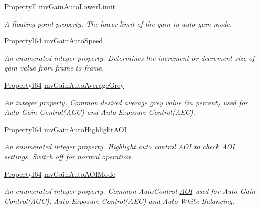 \begin{DoxyCompactItemize}
\hyperlink{group___common_interface_gaf54865fe5a3d5cfd15f9a111b40d09f9}{Property\+F} \hyperlink{classmv_i_m_p_a_c_t_1_1acquire_1_1_gen_i_cam_1_1_analog_control_aee3664e17216fc642f704fc52a4cbbbe}{mv\+Gain\+Auto\+Lower\+Limit}
\begin{DoxyCompactList}\small\item\em A floating point property. The lower limit of the gain in auto gain mode. \end{DoxyCompactList}\item 
\hyperlink{group___common_interface_ga81749b2696755513663492664a18a893}{Property\+I64} \hyperlink{classmv_i_m_p_a_c_t_1_1acquire_1_1_gen_i_cam_1_1_analog_control_a019e7f6318bde08ea5566e57a432dd16}{mv\+Gain\+Auto\+Speed}
\begin{DoxyCompactList}\small\item\em An enumerated integer property. Determines the increment or decrement size of gain value from frame to frame. \end{DoxyCompactList}\item 
\hyperlink{group___common_interface_ga81749b2696755513663492664a18a893}{Property\+I64} \hyperlink{classmv_i_m_p_a_c_t_1_1acquire_1_1_gen_i_cam_1_1_analog_control_adf7a7e9ec02c79afa826b8003e473adf}{mv\+Gain\+Auto\+Average\+Grey}
\begin{DoxyCompactList}\small\item\em An integer property. Common desired average grey value (in percent) used for Auto Gain Control(\+A\+G\+C) and Auto Exposure Control(\+A\+E\+C). \end{DoxyCompactList}\item 
\hyperlink{group___common_interface_ga81749b2696755513663492664a18a893}{Property\+I64} \hyperlink{classmv_i_m_p_a_c_t_1_1acquire_1_1_gen_i_cam_1_1_analog_control_aecf0b956ac5e1f86ae1caef0082fc5e1}{mv\+Gain\+Auto\+Highlight\+A\+O\+I}
\begin{DoxyCompactList}\small\item\em An enumerated integer property. Highlight auto control \hyperlink{struct_a_o_i}{A\+O\+I} to check \hyperlink{struct_a_o_i}{A\+O\+I} settings. Switch off for normal operation. \end{DoxyCompactList}\item 
\hyperlink{group___common_interface_ga81749b2696755513663492664a18a893}{Property\+I64} \hyperlink{classmv_i_m_p_a_c_t_1_1acquire_1_1_gen_i_cam_1_1_analog_control_a24072ac61d06cb5ea2dbc118fc4f1c3f}{mv\+Gain\+Auto\+A\+O\+I\+Mode}
\begin{DoxyCompactList}\small\item\em An enumerated integer property. Common Auto\+Control \hyperlink{struct_a_o_i}{A\+O\+I} used for Auto Gain Control(\+A\+G\+C), Auto Exposure Control(\+A\+E\+C) and Auto White Balancing. \end{DoxyCompactList}\item 

\end{DoxyCompactItemize}
